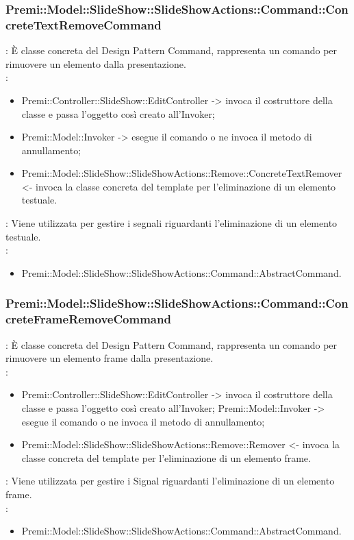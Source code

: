 {     \subsubsection{Premi::Model::SlideShow::SlideShowActions::Command::ConcreteTextRemoveCommand}{
				\textbf{\tipo}: È classe concreta del Design Pattern Command, rappresenta un comando per rimuovere un elemento dalla presentazione.\\	
				\textbf{\relaz}: 
				\begin{itemize}
					\item Premi::Controller::SlideShow::EditController -> invoca il costruttore della classe e passa l’oggetto così creato all’Invoker;
                    \item Premi::Model::Invoker -> esegue il comando o ne invoca il metodo di annullamento;
                    \item Premi::Model::SlideShow::SlideShowActions::Remove::ConcreteTextRemover <- invoca la classe concreta del  template per l’eliminazione di un elemento testuale.
				\end{itemize}	
                \textbf{\interfacce}: Viene utilizzata per gestire i segnali riguardanti l’eliminazione di un elemento testuale.\\
                \textbf{\base}: 
                    \begin{itemize}
                    \item Premi::Model::SlideShow::SlideShowActions::Command::AbstractCommand.
                    \end{itemize}
                    }
        \subsubsection{Premi::Model::SlideShow::SlideShowActions::Command::ConcreteFrameRemoveCommand}{
				\textbf{\tipo}: È classe concreta del Design Pattern Command, rappresenta un comando per rimuovere un elemento frame dalla presentazione.\\	
				\textbf{\relaz}: 
				\begin{itemize}
					\item Premi::Controller::SlideShow::EditController -> invoca il costruttore della classe e passa l’oggetto così creato all’Invoker;
Premi::Model::Invoker -> esegue il comando o ne invoca il metodo di annullamento;
                    \item Premi::Model::SlideShow::SlideShowActions::Remove::Remover <- invoca la classe concreta del  template per l’eliminazione di un elemento frame.
				\end{itemize}	
                \textbf{\interfacce}: Viene utilizzata per gestire i Signal riguardanti l’eliminazione di un elemento frame.\\
                \textbf{\base}: 
                    \begin{itemize}
                    \item Premi::Model::SlideShow::SlideShowActions::Command::AbstractCommand.
                    \end{itemize}
                    }                   
}
